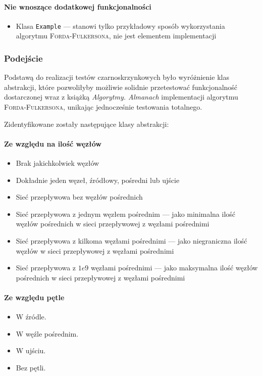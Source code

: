\begin{itemize}[nosep]
\paragraph{Nie wnoszące dodatkowej funkcjonalności}
\begin{itemize}[nosep]
    \item Klasa \texttt{Example} --- stanowi tylko przykładowy sposób wykorzystania algorytmu \textsc{Forda-Fulkersona}, nie jest elementem implementacji%
\end{itemize}

\subsubsection{Podejście}%
Podstawą do realizacji testów czarno\dywiz skrzynkowych było wyróżnienie klas abstrakcji, które pozwoliłyby możliwie solidnie przetestować funkcjonalność dostarczonej wraz z książką \emph{Algorytmy. Almanach} implementacji algorytmu \textsc{Forda-Fulkersona}, unikając jednocześnie testowania totalnego.

Zidentyfikowane zostały następujące klasy abstrakcji:

\paragraph{Ze względu na ilość węzłów}
\begin{itemize}[nosep]
    \item Brak jakichkolwiek węzłów
    \item Dokładnie jeden węzeł, źródłowy, pośredni lub ujście
    \item Sieć przepływowa bez węzłów pośrednich
    \item Sieć przepływowa z jednym węzłem pośrednim --- jako minimalna ilość węzłów pośrednich w sieci przepływowej z węzłami pośrednimi
    \item Sieć przepływowa z kilkoma węzłami pośrednimi --- jako niegraniczna ilość węzłów w sieci przepływowej z węzłami pośrednimi
    \item Sieć przepływowa z $1e9$ węzłami pośrednimi --- jako maksymalna ilość węzłów pośrednich w sieci przepływowej z węzłami pośrednimi
\end{itemize}

\paragraph{Ze względu pętle}
\begin{itemize}[nosep]
    \item W źródle.
    \item W węźle pośrednim.
    \item W ujściu.
    \item Bez pętli.
\end{itemize}


\end{itemize}
